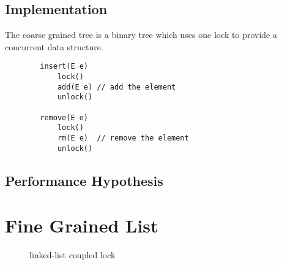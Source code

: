 \documentclass[10pt,a4paper]{article}
\begin{document}
\subsection{Implementation}

The coarse grained tree is a binary tree which uses one lock to provide a concurrent data structure.

    \begin{lstlisting}
        insert(E e) 
            lock()
            add(E e) // add the element
            unlock()

        remove(E e)
            lock()
            rm(E e)  // remove the element
            unlock()
    \end{lstlisting}

\subsection{Performance Hypothesis}

\section{Fine Grained List}
\begin{figure}[h]
\centerline{
}
\caption{linked-list coupled lock}
\end{figure}
\end{document}
